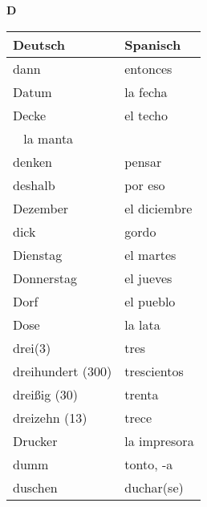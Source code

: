 \begin{flushright}\begin{Huge}\textbf{D}\end{Huge}\end{flushright}

\begin{longtable}{p{} p{}} 
\textbf{Deutsch}     & \textbf{Spanisch}                                       \\ \hline
\hline
\endhead %
dann & entonces\\
Datum & la fecha\\
Decke & el techo\\
~ la manta\\
denken & pensar\\
deshalb & por eso\\
Dezember & el diciembre\\
dick & gordo\\
Dienstag & el martes\\
Donnerstag & el jueves\\
Dorf & el pueblo\\
Dose & la lata\\
drei(3) & tres\\
dreihundert (300) & trescientos\\
dreißig (30) & trenta\\
dreizehn (13) & trece\\
Drucker & la impresora\\
dumm & tonto, -a\\
duschen & duchar(se)\\

\end{longtable}
